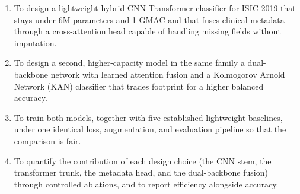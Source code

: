 \begin{enumerate}
  \item To design a lightweight hybrid CNN Transformer classifier for
        ISIC-2019 that stays under 6M parameters and 1 GMAC and that fuses
        clinical metadata through a cross-attention head capable of handling
        missing fields without imputation.
  \item To design a second, higher-capacity model in the same family a
        dual-backbone network with learned attention fusion and a
        Kolmogorov Arnold Network (KAN) classifier that trades footprint
        for a higher balanced accuracy.
  \item To train both models, together with five established lightweight
        baselines, under one identical loss, augmentation, and evaluation
        pipeline so that the comparison is fair.
  \item To quantify the contribution of each design choice (the CNN stem, the
        transformer trunk, the metadata head, and the dual-backbone fusion)
        through controlled ablations, and to report efficiency alongside
        accuracy.
\end{enumerate}

